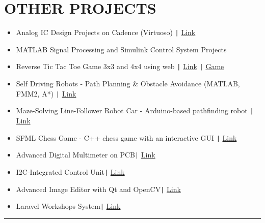 \documentclass[11pt,a4paper]{article}
\begin{document}
\section*{\fontsize{14}{18}\textbf\selectfont OTHER PROJECTS}
\vspace{-0.3cm}
\begin{itemize}[noitemsep, left=0pt, itemsep=5pt]
\item Analog IC Design Projects on Cadence (Virtuoso) \texttt{|} \href{https://github.com/salah0eldin/Analog_Projects}{Link}
\item MATLAB Signal Processing and Simulink Control System Projects
\item Reverse Tic Tac Toe Game 3x3 and 4x4 using web \texttt{|} \href{https://github.com/salah0eldin/Tic_tac_toe_AVOID_THE_X}{Link} \texttt{|} \href{https://salah0eldin.github.io/Tic_tac_toe_AVOID_THE_X/}{Game}
\item Self Driving Robots - Path Planning \& Obstacle Avoidance (MATLAB, FMM2, A*) \texttt{|} \href{https://github.com/salah0eldin/PathPLanningUsingFMM2andAStar}{Link}
\item Maze-Solving Line-Follower Robot Car - Arduino-based pathfinding robot \texttt{|} \href{https://github.com/salah0eldin/ArduinoCarLineFollowerMazeSolver-Saver}{Link}
\item SFML Chess Game - C++ chess game with an interactive GUI \texttt{|} \href{https://github.com/salah0eldin/CHESS_CPP_SFML}{Link}
\item Advanced Digital Multimeter on PCB\texttt{|} {\href{https://www.linkedin.com/feed/update/urn:li:activity:7227981461818138624/}{Link}}
\item I2C-Integrated Control Unit\texttt{|} {\href{https://www.linkedin.com/feed/update/urn:li:activity:7243602012020330497/}{Link}}
\item Advanced Image Editor with Qt and OpenCV\texttt{|} {\href{https://github.com/salah0eldin/CODSOFT/tree/main/C%2B%2B/Task5%20-%20ImageProcessing/ImageEdit}{Link}}
\item Laravel Workshops System\texttt{|} {\href{https://github.com/salah0eldin/WorkshopsSystem}{Link}}
\end{itemize}
\vspace{-0.6cm}
\rule{\textwidth}{0.3pt}\\
\vspace{-0.5cm}
\centering
\end{document}
